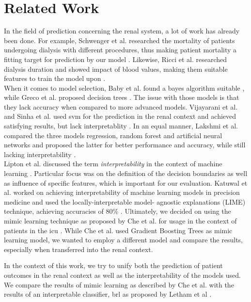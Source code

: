 \documentclass[conference,comsoc]{IEEEtran}
\begin{document}
\section{Related Work}
\label{sec:related}
In the field of prediction concerning the renal system, a lot of work has already been done.
For example, Schwenger et al. researched the mortality of patients undergoing dialysis with different procedures, thus making patient mortality a fitting target for prediction by our model \cite{Schwenger2012}.
Likewise, Ricci et al. researched dialysis duration and showed impact of blood values, making them suitable features to train the model upon \cite{Ricci2006}. \\
When it comes to model selection, Baby et al. found a bayes algorithm suitable \cite{Baby2015}, while Greco et al. proposed decision trees \cite{Greco2010}.
The issue with those models is that they lack accuracy when compared to more advanced models.
Vijayarani et al. and Sinha et al. used \gls{svm} for the prediction in the renal context and achieved satisfying results, but lack interpretablity \cite{Vijayarani2015} \cite{Sinha2015}.
In an equal manner, Lakshmi et al. compared the three models regression, random forest and artificial neural networks and proposed the latter for better performance and accuracy, while still lacking interpretability \cite{Lakshmi2014}. \\
Lipton et al. discussed the term \emph{interpretability} in the context of machine learning \cite{Lipton2016}. 
Particular focus was on the definition of the decision boundaries as well as influence of specific features, which is important for our evaluation.
Katuwal et al. worked on achieving interpretability of machine learning models in precision medicine and used the locally-interpretable model- agnostic explanations (LIME) technique, achieving accuracies of 80\% \cite{Katuwal2016}.
Ultimately, we decided on using the mimic learning technique as proposed by Che et al. for usage in the context of patients in the \gls{icu} \cite{Che2016}.
While Che et al. used Gradient Boosting Trees as mimic learning model, we wanted to employ a different model and compare the results, especially when transferred into the renal context.

In the context of this work, we try to unify both the prediction of patient outcomes in the renal context as well as the interpretability of the models used.
We compare the results of mimic learning as described by Che et al. with the results of an interpretable classifier, \gls{brl} as proposed by Letham et al \cite{Che2016} \cite{Letham2015}.
\end{document}

